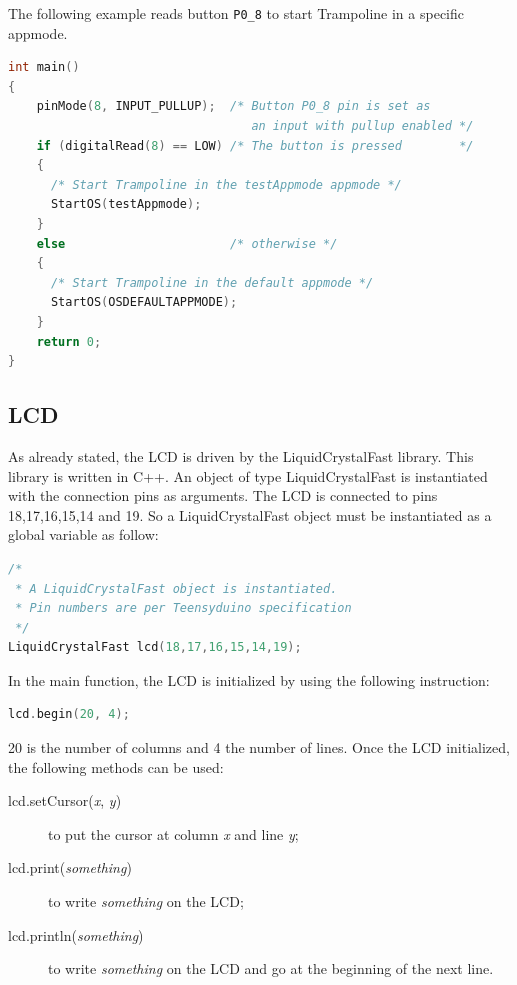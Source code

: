 \documentclass[11pt]{report}
\begin{document}
The following example reads button {\tt P0_8} to start Trampoline in a specific appmode.

\begin{lstlisting}[language=C]
int main()
{
    pinMode(8, INPUT_PULLUP);  /* Button P0_8 pin is set as
                                  an input with pullup enabled */
    if (digitalRead(8) == LOW) /* The button is pressed        */
    {
      /* Start Trampoline in the testAppmode appmode */
      StartOS(testAppmode);
    }
    else                       /* otherwise */
    {
      /* Start Trampoline in the default appmode */
      StartOS(OSDEFAULTAPPMODE);
    }
    return 0;
}
\end{lstlisting}

\subsection{LCD}

As already stated, the LCD is driven by the LiquidCrystalFast library. This library is written in C++. An object of type LiquidCrystalFast is instantiated with the connection pins as arguments. The LCD is connected to pins 18,17,16,15,14 and 19. So a LiquidCrystalFast object must be instantiated as a global variable as follow:

\begin{lstlisting}[language=C]
/*
 * A LiquidCrystalFast object is instantiated.
 * Pin numbers are per Teensyduino specification
 */
LiquidCrystalFast lcd(18,17,16,15,14,19);
\end{lstlisting}

In the main function, the LCD is initialized by using the following instruction:

\begin{lstlisting}[language=C]
  lcd.begin(20, 4);
\end{lstlisting}

20 is the number of columns and 4 the number of lines. Once the LCD initialized, the following methods can be used:
\begin{description}
\item[lcd.setCursor({\it x}, {\it y})] to put the cursor at column {\it x} and line {\it y};
\item[lcd.print({\it something})] to write {\it something} on the LCD;
\item[lcd.println({\it something})] to write {\it something} on the LCD and go at the beginning of the next line.
\end{description}
\end{document}
